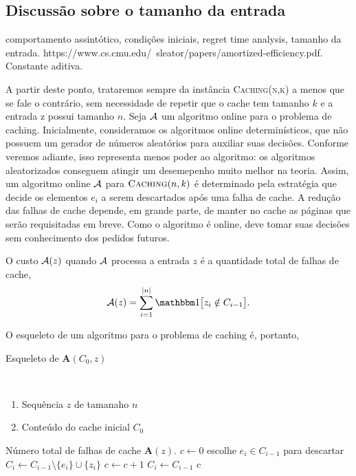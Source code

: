 \subsection{Discussão sobre o tamanho da entrada}

comportamento assintótico, condições iniciais, regret time analysis, tamanho da entrada. https://www.cs.cmu.edu/~sleator/papers/amortized-efficiency.pdf. Constante aditiva.

A partir deste ponto, trataremos sempre da instância \textsc{Caching(n,k)} a menos que se fale o contrário, sem necessidade de repetir que o cache tem tamanho \(k\) e a entrada z possui tamanho \(n\). Seja \(\mathcal{A}\) um algoritmo online para o problema de caching. Inicialmente, consideramos os algoritmos online determinísticos, que não possuem um gerador de números aleatórios para auxiliar suas decisões. Conforme veremos adiante, isso representa menos poder ao algoritmo: os algoritmos aleatorizados conseguem atingir um desemepenho muito melhor na teoria. Assim, um algoritmo online \(\mathcal{A}\) para \(\textsc{Caching}(n,k)\) é determinado pela estratégia que decide os elementos \(e_i\) a serem descartados após uma falha de cache. A redução das falhas de cache depende, em grande parte, de manter no cache as páginas que serão requisitadas em breve. Como o algoritmo é online, deve tomar suas decisões sem conhecimento dos pedidos futuros.

\begin{definition}
  O custo \(\mathcal{A}(z)\) quando \(\mathcal{A}\) processa a entrada \(z\) é a quantidade total de falhas de cache,
  \begin{equation}
    \Acal(z) = \sum_{i=1}^{|n|} \ind{z_i \notin C_{i-1}}.
  \end{equation}
\end{definition}

O esqueleto de um algoritmo para o problema de caching é, portanto,

\begin{algorithm}
  \caption{Esqueleto de \(\mathbf{A}(C_0, z)\)}
  \label{algo:LRU}
  \begin{algorithmic}
    \Require\\
    \begin{enumerate}[label=(\roman*),ref=\roman*]
    \item Sequência \(z\) de tamanaho \(n\) 
    \item Conteúdo do cache inicial \(C_0\)
    \end{enumerate}

    \Ensure Número total de falhas de cache \(\mathbf{A}(z)\).
    \State \(c \gets 0\)
      \State escolhe \(e_i \in C_{i-1}\) para descartar
      \State \(C_i \gets C_{i-1} \setminus \{e_i\}\cup \{z_i\} \)
      \State \(c \gets c + 1\)
    \Else
      \State \(C_i \gets C_{i-1}\)
    \EndIf
    \EndFor
    \State \Return \(c\)
  \end{algorithmic}
\end{algorithm}

